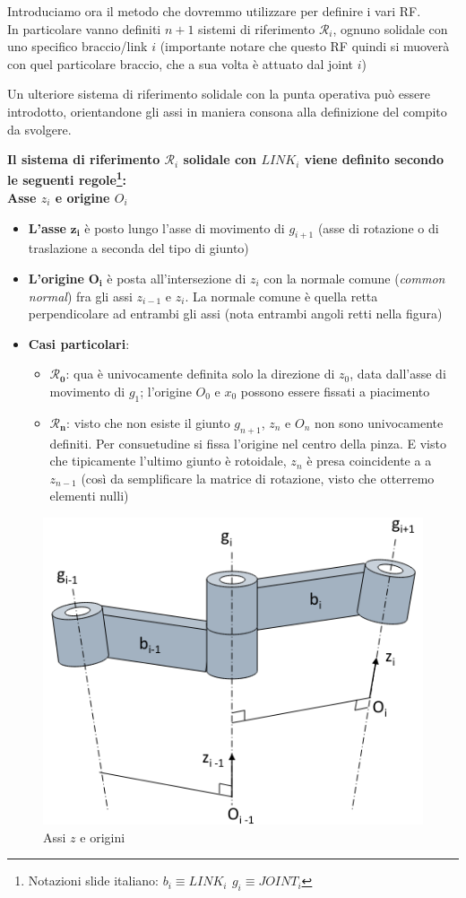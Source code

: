 Introduciamo ora il metodo che dovremmo utilizzare per definire i vari RF. \\
In particolare vanno definiti $n + 1$ sistemi di riferimento $\mathcal{R}_i$, ognuno solidale con uno specifico braccio/link $i$ (importante notare che questo RF quindi si muoverà con quel particolare braccio, che a sua volta è attuato dal joint $i$)

Un ulteriore sistema di riferimento solidale con la punta operativa può essere introdotto, orientandone gli assi in maniera consona alla definizione del compito da svolgere.

\vspace*{25pt}
\textbf{Il sistema di riferimento $\mathcal{R}_i$ solidale con $\textit{LINK}_i$ viene definito secondo le seguenti regole\footnote{Notazioni slide italiano: $b_i \equiv \textit{LINK}_i \, \ g_i \equiv \textit{JOINT}_i$}:}\\

 \textbf{Asse $z_i$ e origine $O_i$}
\begin{itemize}
	\item \textbf{L’asse} $\boldsymbol{z_i}$ è posto lungo l’asse di movimento di $g_{i+1}$ (asse di rotazione o di traslazione a seconda del tipo di giunto)
	\item \textbf{L’origine} $\boldsymbol{O_i}$ è posta all’intersezione di $z_i$ con la normale comune (\textit{common normal}) fra gli assi $z_{i-1}$ e $z_i$.
	La normale comune è quella retta perpendicolare ad entrambi gli assi (nota entrambi angoli retti nella figura)
	\item \textbf{Casi particolari}:
	\begin{itemize}
		\item $\boldsymbol{\mathcal{R}_0}$: qua è univocamente definita solo la direzione di $z_0$, data dall’asse di movimento di $g_1$; l’origine $O_0$ e $x_0$ possono essere fissati a piacimento
		\item $\boldsymbol{\mathcal{R}_n}$: visto che non esiste il giunto $g_{n+1}$, $z_n$ e $O_n$ non sono univocamente definiti. Per consuetudine si fissa l’origine nel centro della pinza. E visto che tipicamente l'ultimo giunto è rotoidale, $z_n$ è presa coincidente a a $z_{n-1}$ (così da semplificare la matrice di rotazione, visto che otterremo elementi nulli)
	\end{itemize}
\end{itemize}

\begin{figure}[H]
	\centering
	\includegraphics[width=0.4\linewidth]{images/kinematics_6}
	\caption{Assi $z$ e origini}
	\label{fig:kinematics6}
\end{figure}



